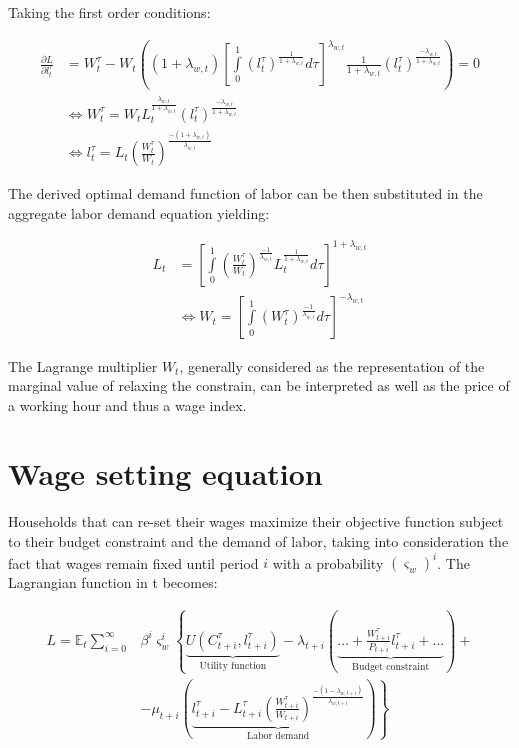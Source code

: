 \documentclass{pracamgr}
\numberwithin{equation}{section}
\begin{document}
{\color{red} Taking the first order conditions:

\begin{align} \label{Optimal demand function for labor}
\frac{\partial L}{\partial l_{t}^{\tau}} &= W_{t}^{\tau} - W_{t} \left( \left( 1+\lambda_{w ,t} \right) \left[  \int\limits_{0}^{1} \left( l_{t}^{\tau} \right)^{\frac{1}{1+\lambda_{w ,t}}} d\tau \right]^{\lambda_{w ,t}} \frac{1}{1+\lambda_{w ,t}}  \left( l_{t}^{\tau} \right)^{\frac{-\lambda_{w ,t}}{1+\lambda_{w ,t}}} \right) = 0 \nonumber \\
& \iff W_{t}^{\tau} = W_{t} L_{t}^{\frac{\lambda_{w ,t}}{1+\lambda_{w,t}}} \left( l_{t}^{\tau} \right)^{\frac{-\lambda_{w,t}}{1+\lambda_{w ,t}}} \nonumber \\
& \iff l_{t}^{\tau}= L_{t} \left( \frac{W_{t}^{\tau}}{W_{t}}\right)^{\frac{-(1+\lambda_{w,t})}{\lambda_{w ,t}}}
\end{align} }

The derived optimal demand function of labor can be then substituted in the aggregate labor demand equation yielding:

\begin{align}
L_{t} &= \left[ \int\limits_{0}^{1} \left( \frac{W_{t}^{\tau}}{W_{t}}\right)^{\frac{-1}{\lambda_{w ,t}}} L_{t}^{\frac{1}{1+\lambda_{w ,t}}} d\tau \right]^{1+\lambda_{w,t}} \nonumber \\
& \iff W_{t} = \left[ \int\limits_{0}^{1} \left( W_{t}^{\tau} \right)^{\frac{-1}{\lambda_{w ,t}}}  d\tau \right]^{-\lambda_{w,t}}
\end{align}

The Lagrange multiplier $W_{t}$, generally considered as the representation of the marginal value of relaxing the constrain, can be interpreted as well as the price of a working hour and thus a wage index.

\section*{Wage setting equation}

Households that can re-set their wages maximize their objective function subject to their budget constraint and the demand of labor, taking into consideration the fact that wages remain fixed until period $i$ with a probability $\left( \varsigma_{w} \right)^{i}$. The Lagrangian function in t becomes:

\begin{align}
L = \mathbb{E}_{t} \sum\limits_{i=0}^{\infty} &\beta^{i} \varsigma_{w}^{i} \left\{\underbrace{U \left(C_{t+i}^{\tau}, l_{t+i}^{\tau} \right)}_\text{Utility function} - \lambda_{t+i} \left( \underbrace{\ldots + \frac{W_{t+i}^{\tau}}{P_{t+i}} l_{t+i}^{\tau} + \ldots }_\text{Budget constraint} \right) + \nonumber \right. \\ 
& \left. - \mu_{t+i} \left( \underbrace{l_{t+i}^{\tau} - L_{t+i}^{\tau} \left(\frac{W_{t+i}^{\tau}}{W_{t+i}} \right)^{\frac{-\left(1-\lambda_{w, t+i}\right)}{\lambda_{w, t+i}}}}_\text{Labor demand} \right) \right\}
\end{align}
\end{document}
